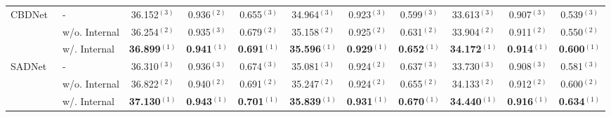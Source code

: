 \begin{table}[htbp]
{\begin{tabular}{llccccccccc}
			\hline
			\hline
			\multirow{3}{*}{CBDNet~\cite{guo_toward_2019}}                           & -                                                           & 36.152$^{(3)}$          & 0.936$^{(2)}$          & 0.655$^{(3)}$          & 34.964$^{(3)}$          & 0.923$^{(3)}$          & 0.599$^{(3)}$          & 33.613$^{(3)}$          & 0.907$^{(3)}$          & 0.539$^{(3)}$          \\
			                                                                         & w/o. Internal                                               & 36.254$^{(2)}$          & 0.935$^{(3)}$          & 0.679$^{(2)}$          & 35.158$^{(2)}$          & 0.925$^{(2)}$          & 0.631$^{(2)}$          & 33.904$^{(2)}$          & 0.911$^{(2)}$          & 0.550$^{(2)}$          \\
			                                                                         & w/. Internal                                                & \textbf{36.899$^{(1)}$} & \textbf{0.941$^{(1)}$} & \textbf{0.691$^{(1)}$} & \textbf{35.596$^{(1)}$} & \textbf{0.929$^{(1)}$} & \textbf{0.652$^{(1)}$} & \textbf{34.172$^{(1)}$} & \textbf{0.914$^{(1)}$} & \textbf{0.600$^{(1)}$} \\
			\hline
			\hline
			\multirow{3}{*}{SADNet~\cite{chang_spatial-adaptive_2020}}               & -                                                           & 36.310$^{(3)}$          & 0.936$^{(3)}$          & 0.674$^{(3)}$          & 35.081$^{(3)}$          & 0.924$^{(2)}$          & 0.637$^{(3)}$          & 33.730$^{(3)}$          & 0.908$^{(3)}$          & 0.581$^{(3)}$          \\
			                                                                         & w/o. Internal                                               & 36.822$^{(2)}$          & 0.940$^{(2)}$          & 0.691$^{(2)}$          & 35.247$^{(2)}$          & 0.924$^{(2)}$          & 0.655$^{(2)}$          & 34.133$^{(2)}$          & 0.912$^{(2)}$          & 0.600$^{(2)}$          \\
			                                                                         & w/. Internal                                                & \textbf{37.130$^{(1)}$} & \textbf{0.943$^{(1)}$} & \textbf{0.701$^{(1)}$} & \textbf{35.839$^{(1)}$} & \textbf{0.931$^{(1)}$} & \textbf{0.670$^{(1)}$} & \textbf{34.440$^{(1)}$} & \textbf{0.916$^{(1)}$} & \textbf{0.634$^{(1)}$} \\
			\bottomrule
		\end{tabular}}
\end{table}
